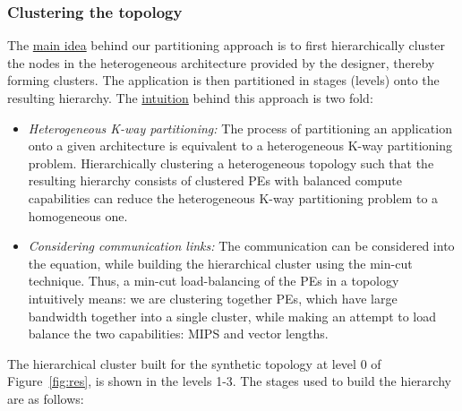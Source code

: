 \subsubsection{Clustering the topology}
\label{sec:clustering-topology}

The \underline{main idea} behind our partitioning approach is to first
hierarchically cluster the nodes in the heterogeneous architecture provided
by the designer, thereby forming clusters. The
application is then partitioned in stages (levels) onto the resulting
hierarchy. The \underline{intuition} behind this approach is two fold:

\begin{itemize}

\item \textit{Heterogeneous K-way partitioning:} The process of
  partitioning an application onto a given architecture is equivalent to
  a heterogeneous K-way partitioning problem. Hierarchically clustering
  a heterogeneous topology such that the resulting hierarchy consists of
  clustered PEs with balanced compute capabilities can reduce the
  heterogeneous K-way partitioning problem to a homogeneous one.

\item \textit{Considering communication links:} The communication can be
  considered into the equation, while building the hierarchical cluster
  using the min-cut technique. Thus, a min-cut load-balancing of the PEs
  in a topology intuitively means: we are clustering together PEs, which
  have large bandwidth together into a single cluster, while
  making an attempt to load balance the two capabilities: MIPS and
  vector lengths.

\end{itemize}

The hierarchical cluster built for the synthetic topology at level 0 of
Figure~\ref{fig:res}, is shown in the levels 1-3. The stages used to
build the hierarchy are as follows:

